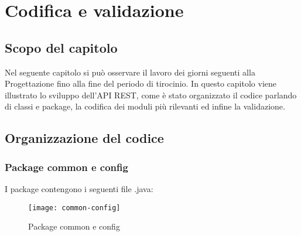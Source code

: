 \chapter{Codifica e validazione}
\label{cap:codifica-validazione}

\section{Scopo del capitolo}
Nel seguente capitolo si può osservare il lavoro dei giorni seguenti alla Progettazione fino alla fine del periodo di tirocinio. In questo capitolo viene illustrato lo sviluppo dell'API REST, come è stato organizzato il codice parlando di classi e package, la codifica dei moduli più rilevanti ed infine la validazione. \\



\section{Organizzazione del codice}
\subsection{Package common e config}
I package contengono i seguenti file .java:

\begin{figure}[H] 
    \centering 
    \texttt{[image: common-config]} 
    \caption{Package common e config}
\end{figure}













